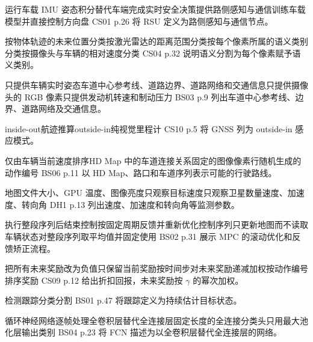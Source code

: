 
{运行车载 IMU 姿态积分}{替代车端完成实时安全决策}{提供路侧感知与通信}{训练车载模型并直接控制方向盘}
{C}{S01 p.26 将 RSU 定义为路侧感知与通信节点。}

{按物体轨迹的未来位置分类}{按激光雷达的距离范围分类}{按每个像素所属的语义类别分类}{按摄像头与车辆的相对速度分类}
{C}{S04 p.32 说明语义分割为每个像素赋予语义类别。}

{只提供车辆实时姿态}{车道中心参考线、道路边界、道路网络和交通信息}{只提供摄像头的 RGB 像素}{只提供发动机转速和制动压力}
{B}{S03 p.9 列出车道中心参考线、边界、道路网络及交通信息。}

{inside-out}{航迹推算}{outside-in}{纯视觉里程计}
{C}{S10 p.5 将 GNSS 列为 outside-in 感应模式。}

{仅由车辆当前速度排序}{HD Map 中的车道连接关系}{固定的图像像素行}{随机生成的动作编号}
{B}{S06 p.11 以 HD Map、路口和车道序列表示可能的行驶路线。}

{地图文件大小、GPU 温度、图像亮度}{只观察目标速度}{只观察卫星数量}{速度、加速度、转向角}
{D}{H1 p.13 列出速度、加速度和转向角等监测参数。}

{执行整段序列后结束控制}{按固定周期反馈并重新优化控制序列}{只更新地图而不读取车辆状态}{对整段序列取平均值并固定使用}
{B}{S02 p.31 展示 MPC 的滚动优化和反馈矫正流程。}

{把所有未来奖励改为负值}{只保留当前奖励}{按时间步对未来奖励递减加权}{按动作编号排序奖励}
{C}{S09 p.12 给出折扣回报，未来奖励按 $\gamma$ 的幂次加权。}

{检测}{跟踪}{分类}{分割}
{B}{S01 p.47 将跟踪定义为持续估计目标状态。}

{循环神经网络逐帧处理}{全卷积层替代全连接层}{固定长度的全连接分类头}{只用最大池化层输出类别}
{B}{S04 p.23 将 FCN 描述为以全卷积层替代全连接层的网络。}

